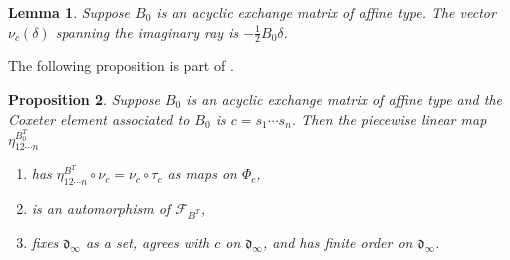 \documentclass{amsart}
\newtheorem{proposition}{Proposition}[section]
\newtheorem{lemma}[proposition]{Lemma}
\theoremstyle{definition}
\theoremstyle{remark}
\numberwithin{equation}{section}
\newcommand{\set}[1]{{\lbrace #1 \rbrace}}
\newcommand{\br}[1]{{\langle #1 \rangle}}
\newcommand{\F}{{\mathcal F}}
\newcommand{\0}{{\mathbf{0}}}
\newcommand{\g}{\mathbf{g}}
\renewcommand{\d}{{\mathfrak d}}
\newcommand{\fin}{\mathrm{fin}}
\newcommand{\RSChar}{\Phi}
\newcommand{\RS}{\RSChar}
\newcommand{\RSfin}{\RS_\fin}
\newcommand{\AP}[1]{\RS_{#1}}
\begin{document}
\begin{lemma}\label{nu delta}  
Suppose $B_0$ is an acyclic exchange matrix of affine type.
The vector~$\nu_c(\delta)$ spanning the imaginary ray is $-\frac12B_0\delta$.
\end{lemma}

The following proposition is part of \cite[Proposition~7.31]{affscat}.

\begin{proposition}\label{eta nice} 
Suppose $B_0$ is an acyclic exchange matrix of affine type and the Coxeter element associated to $B_0$ is $c=s_1\cdots s_n$.
Then the piecewise linear map $\eta^{B_0^T}_{12\cdots n}$
\begin{enumerate}[label=\bf\arabic*., ref=\arabic*]
\item \label{nu tau}   
has $\eta^{B^T}_{12\cdots n}\circ\nu_c=\nu_c\circ\tau_c$ as maps on $\AP{c}$, 
\item\label{eta aut mut}
is an automorphism of $\F_{B^T}$,
\item\label{eta is c}
fixes $\d_\infty$ as a set, agrees with $c$ on $\d_\infty$, and has finite order on $\d_\infty$.
\end{enumerate}
\end{proposition}
\end{document}
